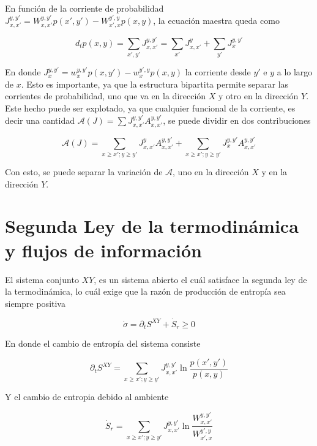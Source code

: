 En función de la corriente de probabilidad $J_{x,x'}^{y,y'} = W_{x,x'}^{y,y'}p(x',y') - W_{x',x}^{y',y}p(x,y)$, la ecuación maestra queda como 

\begin{equation*}
    d_{t}p(x,y) = \sum_{x',y'}J_{x,x'}^{y,y'} = \sum_{x'}J_{x,x'}^{y} + \sum_{y'}J_{x}^{y,y'}
\end{equation*}

En donde $J_{x}^{y,y'} = w_{x}^{y,y'}p(x,y') - w_{x}^{y',y}p(x,y)$ la corriente desde $y'$ e $y$ a lo largo de $x$. Esto es importante, ya que la estructura bipartita permite separar las corrientes de probabilidad, uno que va en la dirección $X$ y otro en la dirección $Y$. Este hecho puede ser explotado, ya que cualquier funcional de la corriente, es decir una cantidad $\mathcal{A}(J) = \sum J_{x,x'}^{y,y'}A_{x,x'}^{y,y'}$, se puede dividir en dos contribuciones\cite{horowitz2014thermodynamics}

\begin{equation}
    \mathcal{A}(J) = \sum_{x\geq x';y \geq y'} J_{x,x'}^{y}A_{x,x'}^{y,y'} + \sum_{x \geq x'; y \geq y'}J_{x}^{y,y'} A_{x,x'}^{y,y'}
\label{sec4:functionalcurrent}
\end{equation}

Con esto, se puede separar la variación de $\mathcal{A}$, uno en la dirección $X$ y en la dirección $Y$. 


\section{Segunda Ley de la termodinámica y flujos de información}
El sistema conjunto $XY$, es un sistema abierto el cuál satisface la segunda ley de la termodinámica, lo cuál exige que la razón de producción de entropía sea siempre positiva

\begin{equation*}
    \dot{\sigma} = \partial_{t}S^{XY} + \dot{S}_{r} \geq 0 
\end{equation*}

En donde el cambio de entropía del sistema consiste

\begin{equation*}
    \partial_{t}S^{XY} = \sum_{x\geq x'; y\geq y'} J_{x,x'}^{y,y'} \ln \frac{p(x',y')}{p(x,y)}
\end{equation*}

Y el cambio de entropia debido al ambiente

\begin{equation*}
    \dot{S}_{r} = \sum_{x\geq x'; y\geq y'} J_{x,x'}^{y,y'} \ln \frac{W_{x,x'}^{y,y'}}{W_{x',x}^{y',y}}
\end{equation*}

